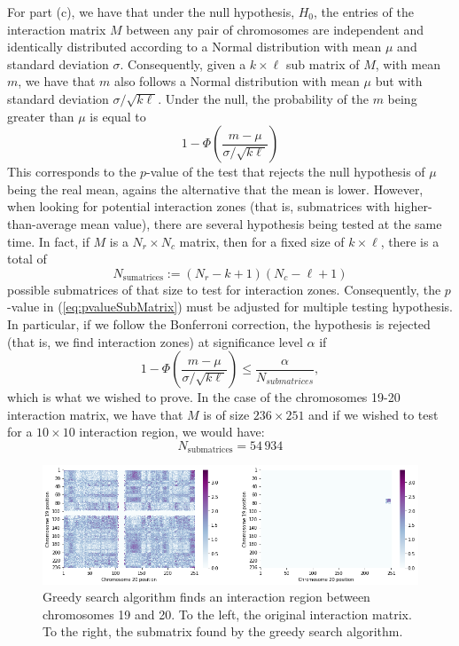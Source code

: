 \documentclass[11pt, english, twocolumn]{article}
\begin{document}
For part (c), we have that under the null hypothesis, $H_{0}$, the entries of the interaction matrix $M$ between any pair of chromosomes are independent and identically distributed according to a Normal distribution with mean $\mu$ and standard deviation $\sigma$. Consequently, given a $k \times \ell$ sub matrix of $M$, with mean $m$, we have that $m$ also follows a Normal distribution with mean $\mu$ but with standard deviation $\sigma/\sqrt{k\ell}$. Under the null, the probability of the $m$ being greater than $\mu$ is equal to
	\begin{equation} \label{eq:pvalueSubMatrix}
		1 - \Phi\left(\frac{m - \mu}{\sigma/\sqrt{k\ell}}\right)
	\end{equation}
This corresponds to the $p$-value of the test that rejects the null hypothesis of $\mu$ being the real mean, agains the alternative that the mean is lower. However, when looking for potential interaction zones (that is, submatrices with higher-than-average mean value), there are several hypothesis being tested at the same time. In fact, if $M$ is a $N_{r} \times N_{c}$ matrix, then for a fixed size of $k \times \ell$, there is a total of
	$$N_{\text{sumatrices}} := (N_{r} - k + 1)(N_{c} - \ell + 1)$$
possible submatrices of that size to test for interaction zones. Consequently, the $p$-value in (\ref{eq:pvalueSubMatrix}) must be adjusted for multiple testing hypothesis. In particular, if we follow the Bonferroni correction, the hypothesis is rejected (that is, we find interaction zones) at significance level $\alpha$ if
	$$1 - \Phi\left(\frac{m - \mu}{\sigma/\sqrt{k\ell}}\right) \leq \frac{\alpha}{N_{submatrices}},$$
which is what we wished to prove. In the case of the chromosomes 19-20 interaction matrix, we have that $M$ is of size $236 \times 251$ and if we wished to test for a $10 \times 10$ interaction region, we would have:
	$$N_{\text{submatrices}} = 54\,934$$
	
\begin{figure}[t]
	\centering
	\includegraphics[width=.7\textwidth]{greedy-search}
	\caption{Greedy search algorithm finds an interaction region between chromosomes 19 and 20. To the left, the original interaction matrix. To the right, the submatrix found by the greedy search algorithm.}
	\label{fig:greedy-search}
\end{figure}
\end{document}
